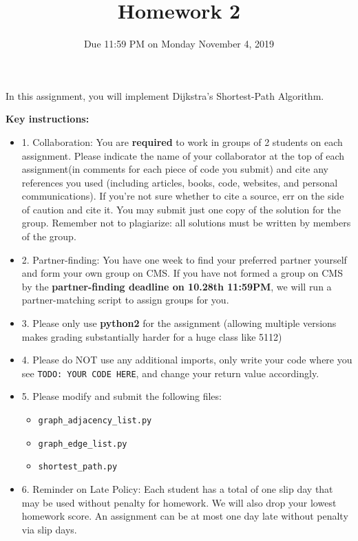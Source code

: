 \documentclass{article}
\title{\vspace{-2 em}Homework 2}
\date{}
\author{Due 11:59 PM on Monday November 4, 2019}
\begin{document}
\maketitle
\thispagestyle{fancy}
	
	In this assignment, you will implement Dijkstra's Shortest-Path Algorithm.
	
    \textbf{Key instructions:}
    \begin{itemize}
 
        \item 1. Collaboration: You are \textbf{required} to work in groups of 2 students on each assignment. Please indicate the name of your collaborator at the top of each assignment(in comments for each piece of code you submit) and cite any references you used (including articles, books, code, websites, and personal communications). If you're not sure whether to cite a source, err on the side of caution and cite it. You may submit just one copy of the solution for the group. Remember not to plagiarize: all solutions must be written by members of the group. 
         \item 2. Partner-finding: You have one week to find your preferred partner yourself and form your own group on CMS. If you have not formed a group on CMS by the \textbf{partner-finding deadline on 10.28th 11:59PM}, we will run a partner-matching script to assign groups for you.
        \item 3. Please only use \textbf{python2} for the assignment (allowing multiple versions makes grading substantially harder for a huge class like 5112)
        \item 4. Please do NOT use any additional imports, only write your code where you see \texttt{TODO: YOUR CODE HERE}, and change your return value accordingly. 
        \item 5. Please modify and submit the following files:
   \begin{itemize}
        \item \verb|graph_adjacency_list.py|
        \item \verb|graph_edge_list.py|
        \item \verb|shortest_path.py|
    \end{itemize}
        \item 6. Reminder on Late Policy: Each student has a total of one slip day that may be used without penalty for homework. We will also drop your lowest homework score. An assignment can be at most one day late without penalty via slip days.

    \end{itemize}
\end{document}
